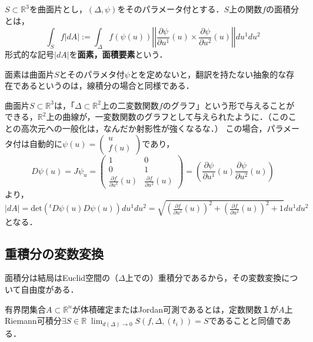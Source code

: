 \documentclass[uplatex, dvipdfmx]{jsreport}
\begin{document}
\begin{definition}[曲面片上での面積分]
    $S\subset\mathbb{R}^3$を曲面片とし，$(\Delta,\psi)$をそのパラメータ付とする．$S$上の関数$f$の面積分とは，
    \[ \int_S f|dA| := \int_\Delta f(\psi(u))\left|\left| \frac{\partial \psi}{\partial u^1}(u)\times \frac{\partial \psi}{\partial u^2}(u) \right|\right|du^1du^2 \]
    形式的な記号$|dA|$を\textbf{面素，面積要素}という．
\end{definition}
\begin{remark*}
    面素は曲面片$S$とそのパラメタ付$\psi$とを定めないと，翻訳を持たない抽象的な存在であるというのは，線積分の場合と同様である．
\end{remark*}
\begin{example}
    曲面片$S\subset\mathbb{R}^3$は，「$\Delta\subset\mathbb{R}^2$上の二変数関数$f$のグラフ」という形で与えることができる，$\mathbb{R}^2$上の曲線が，一変数関数のグラフとして与えられたように．（このことの高次元への一般化は，なんだか射影性が強くなるな．）
    この場合，パラメータ付は自動的に$\psi(u)=\left(\begin{array}{c}u \\ f(u)\end{array}\right)$であり，
    \[ D\psi(u)=J\psi_u=\left(\begin{array}{cc}1&0\\0&1\\\frac{\partial f}{\partial u^1}(u)&\frac{\partial f}{\partial u^2}(u)\end{array}\right)=\left(\frac{\partial \psi}{\partial u^1}(u)\frac{\partial \psi}{\partial u^2}(u)\right) \]
    より，$|dA|=\mathrm{det}({}^tD\psi(u)D\psi(u))du^1du^2=\sqrt{\left(\frac{\partial f}{\partial u^1}(u)\right)^2+\left(\frac{\partial f}{\partial u^2}(u)\right)^2+1}du^1du^2$となる．
\end{example}

\subsection{重積分の変数変換}
面積分は結局はEuclid空間の（$\Delta$上での）重積分であるから，その変数変換について自由度がある．

\begin{proposition}[Jordan可測のRiemann積分からの特徴付け]
    有界閉集合$A\subset\mathbb{R}^n$が体積確定またはJordan可測であるとは，定数関数１が$A$上Riemann可積分$\exists S\in\mathbb{R}\; \lim_{d(\Delta)\to 0}S(f,\Delta,(t_i))=S$であることと同値である．
\end{proposition}
\end{document}
